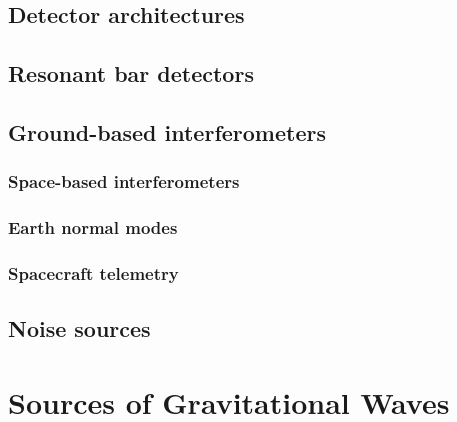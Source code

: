 \documentclass{kentigern}
\theoremstyle{definition}
\begin{document}
 

 \section{Detector architectures}
 \label{sec:detect-arch}

 \section{Resonant bar detectors}
 \label{sec:reson-bar-detect}

 \section{Ground-based interferometers}
 \label{sec:ground-based-interf}
 


 \subsection{Space-based interferometers}
 \label{sec:space-based-interf}

 \subsection{Earth normal modes}
 \label{sec:earth-normal-modes}

 \subsection{Spacecraft telemetry}
 \label{sec:spacecraft-telemetry}
 
 \section{Noise sources}
 \label{sec:an-overview-noise}
 


 \chapter{Sources of Gravitational Waves}
 \label{cha:sourc-grav-waves}
\chapterprecis{}
 
\end{document}

